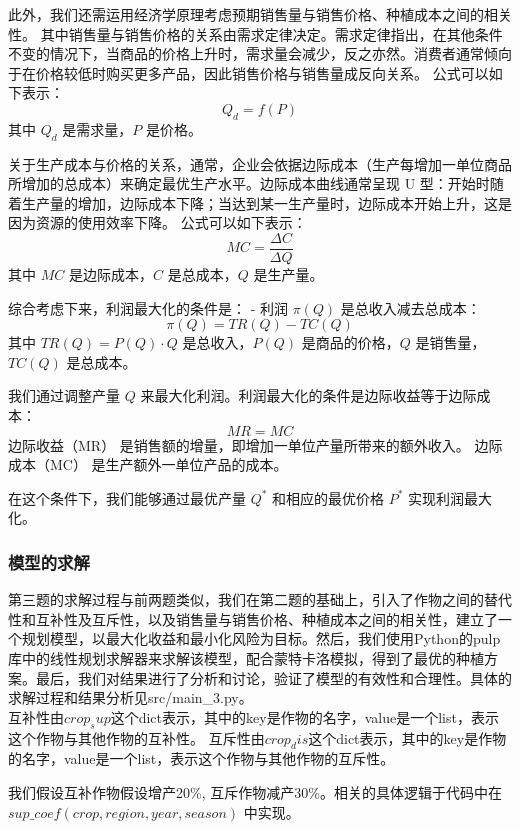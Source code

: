 \documentclass[withoutpreface]{cumcmthesis}
\begin{document}
此外，我们还需运用经济学原理考虑预期销售量与销售价格、种植成本之间的相关性。
其中销售量与销售价格的关系由需求定律决定。需求定律指出，在其他条件不变的情况下，当商品的价格上升时，需求量会减少，反之亦然。消费者通常倾向于在价格较低时购买更多产品，因此销售价格与销售量成反向关系。
公式可以如下表示：  
  \[ Q_d = f(P) \]
  其中 \( Q_d \) 是需求量，\( P \) 是价格。
  
关于生产成本与价格的关系，通常，企业会依据边际成本（生产每增加一单位商品所增加的总成本）来确定最优生产水平。边际成本曲线通常呈现 U 型：开始时随着生产量的增加，边际成本下降；当达到某一生产量时，边际成本开始上升，这是因为资源的使用效率下降。
公式可以如下表示：  
\[ MC = \frac{\Delta C}{\Delta Q} \]
其中 \( MC \) 是边际成本，\( C \) 是总成本，\( Q \) 是生产量。

综合考虑下来，利润最大化的条件是：
- 利润 \( \pi(Q) \) 是总收入减去总成本：
  \[
  \pi(Q) = TR(Q) - TC(Q)
  \]
  其中 \( TR(Q) = P(Q) \cdot Q \) 是总收入，\( P(Q) \) 是商品的价格，\( Q \) 是销售量，\( TC(Q) \) 是总成本。

我们通过调整产量 \( Q \) 来最大化利润。利润最大化的条件是边际收益等于边际成本：
  \[
  MR = MC
  \]
  边际收益（MR） 是销售额的增量，即增加一单位产量所带来的额外收入。
  边际成本（MC） 是生产额外一单位产品的成本。

在这个条件下，我们能够通过最优产量 \( Q^* \) 和相应的最优价格 \( P^* \) 实现利润最大化。


\subsubsection{模型的求解}
第三题的求解过程与前两题类似，我们在第二题的基础上，引入了作物之间的替代性和互补性及互斥性，以及销售量与销售价格、种植成本之间的相关性，建立了一个规划模型，以最大化收益和最小化风险为目标。然后，我们使用Python的pulp库中的线性规划求解器来求解该模型，配合蒙特卡洛模拟，得到了最优的种植方案。最后，我们对结果进行了分析和讨论，验证了模型的有效性和合理性。具体的求解过程和结果分析见src/main\_3.py。\\

互补性由$ crop_sup $这个dict表示，其中的key是作物的名字，value是一个list，表示这个作物与其他作物的互补性。
互斥性由$ crop_dis $这个dict表示，其中的key是作物的名字，value是一个list，表示这个作物与其他作物的互斥性。
  
我们假设互补作物假设增产20\%, 互斥作物减产30\%。相关的具体逻辑于代码中在$ sup\_coef(crop, region, year, season) $ 中实现。\\
\end{document}
